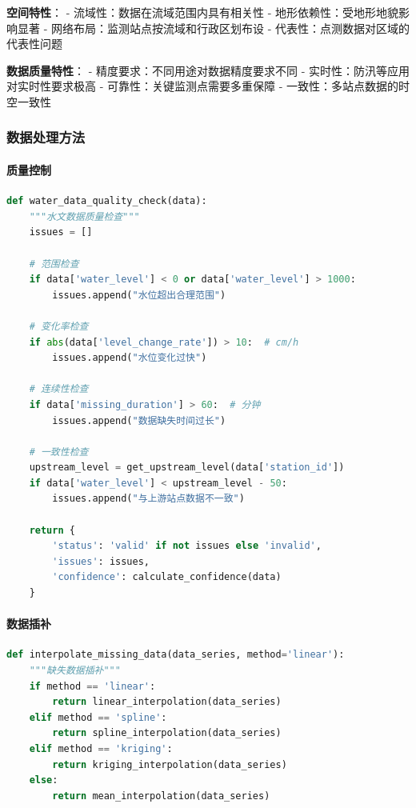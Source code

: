 \textbf{空间特性}： - 流域性：数据在流域范围内具有相关性 -
地形依赖性：受地形地貌影响显著 - 网络布局：监测站点按流域和行政区划布设
- 代表性：点测数据对区域的代表性问题

\textbf{数据质量特性}： - 精度要求：不同用途对数据精度要求不同 -
实时性：防汛等应用对实时性要求极高 - 可靠性：关键监测点需要多重保障 -
一致性：多站点数据的时空一致性

\subsubsection{数据处理方法}\label{ux6570ux636eux5904ux7406ux65b9ux6cd5}

\paragraph{质量控制}\label{ux8d28ux91cfux63a7ux5236}

\begin{lstlisting}[language=Python]
def water_data_quality_check(data):
    """水文数据质量检查"""
    issues = []
    
    # 范围检查
    if data['water_level'] < 0 or data['water_level'] > 1000:
        issues.append("水位超出合理范围")
    
    # 变化率检查
    if abs(data['level_change_rate']) > 10:  # cm/h
        issues.append("水位变化过快")
    
    # 连续性检查
    if data['missing_duration'] > 60:  # 分钟
        issues.append("数据缺失时间过长")
    
    # 一致性检查
    upstream_level = get_upstream_level(data['station_id'])
    if data['water_level'] < upstream_level - 50:
        issues.append("与上游站点数据不一致")
    
    return {
        'status': 'valid' if not issues else 'invalid',
        'issues': issues,
        'confidence': calculate_confidence(data)
    }
\end{lstlisting}

\paragraph{数据插补}\label{ux6570ux636eux63d2ux8865}

\begin{lstlisting}[language=Python]
def interpolate_missing_data(data_series, method='linear'):
    """缺失数据插补"""
    if method == 'linear':
        return linear_interpolation(data_series)
    elif method == 'spline':
        return spline_interpolation(data_series)
    elif method == 'kriging':
        return kriging_interpolation(data_series)
    else:
        return mean_interpolation(data_series)
\end{lstlisting}

